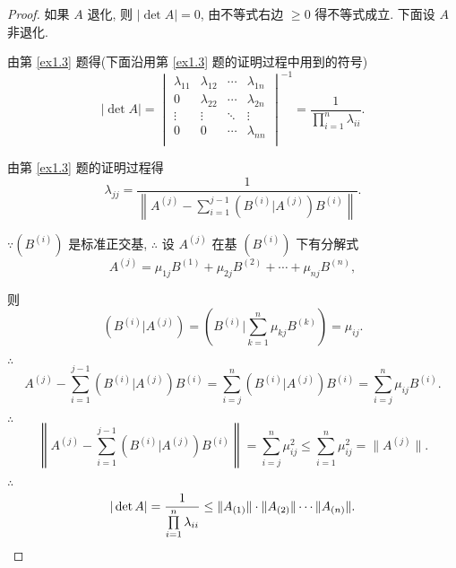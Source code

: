 \documentclass{ctexart}
\begin{document}
\begin{proof}
    如果 $A$ 退化, 则 $|\det A|=0$, 由不等式右边 $\geq0$ 得不等式成立. 下面设 $A$ 非退化.

    由第 \ref{ex1.3} 题得(下面沿用第 \ref{ex1.3} 题的证明过程中用到的符号)
    \[|\det A|=\begin{vmatrix}
        \lambda_{11} & \lambda_{12} & \cdots & \lambda_{1n} \\
        0 & \lambda_{22} & \cdots & \lambda_{2n} \\
        \vdots & \vdots & \ddots & \vdots \\
        0 & 0 & \cdots & \lambda_{nn} \\
    \end{vmatrix}^{-1}=\dfrac{1}{\prod\limits_{i=1}^n\lambda_{ii}}.\]

    由第 \ref{ex1.3} 题的证明过程得
    \[\lambda_{jj}=\dfrac{1}{\left\|A^{(j)}-\sum\limits_{i=1}^{j-1}(B^{(i)}|A^{(j)})B^{(i)}\right\|}.\]

    $\because(B^{(i)})$ 是标准正交基, $\therefore$ 设 $A^{(j)}$ 在基 $(B^{(i)})$ 下有分解式
    \[A^{(j)}=\mu_{1j}B^{(1)}+\mu_{2j}B^{(2)}+\cdots+\mu_{nj}B^{(n)},\]

    则
    \[(B^{(i)}|A^{(j)})=\left(B^{(i)}\bigg|\sum\limits_{k=1}^n\mu_{kj}B^{(k)}\right)=\mu_{ij}.\]

    $\therefore$
    \[A^{(j)}-\sum\limits_{i=1}^{j-1}(B^{(i)}|A^{(j)})B^{(i)}=\sum\limits_{i=j}^n(B^{(i)}|A^{(j)})B^{(i)}=\sum\limits_{i=j}^n\mu_{ij}B^{(i)}.\]

    $\therefore$
    \[\left\|A^{(j)}-\sum\limits_{i=1}^{j-1}(B^{(i)}|A^{(j)})B^{(i)}\right\|=\sum\limits_{i=j}^n\mu_{ij}^2\leq\sum\limits_{i=1}^n\mu_{ij}^2=\|A^{(j)}\|.\]

    $\therefore$
    \[|\det A|=\dfrac{1}{\prod\limits_{i=1}^n\lambda_{ii}}\leq\|A_{(1)}\|\cdot\|A_{(2)}\|\cdots\|A_{(n)}\|.\qedhere\]
\end{proof}
\end{document}
